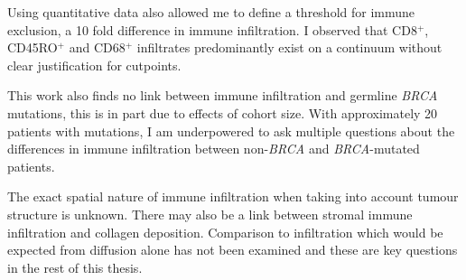 Using quantitative data also allowed me to define a threshold for immune exclusion, a 10 fold difference in immune infiltration. I observed that CD8$^+$,  CD45RO$^+$ and  CD68$^+$  infiltrates predominantly exist on a continuum without clear justification for cutpoints.

This work also finds no link between immune infiltration and germline \textit{BRCA} mutations, this is in part due to effects of cohort size. With approximately 20 patients with mutations, I am underpowered to ask multiple questions about the differences in immune infiltration between non-\textit{BRCA} and \textit{BRCA}-mutated patients.

The exact spatial nature of immune infiltration when taking into account tumour structure is unknown. There may also be a link between stromal immune infiltration and collagen deposition. Comparison to infiltration which would be expected from diffusion alone has not been examined and these are key questions in the rest of this thesis.

